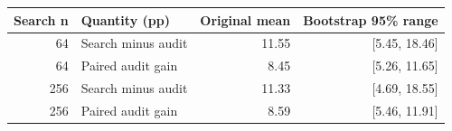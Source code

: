 \begin{tabular}{rlrr}
\toprule
Search n & Quantity (pp) & Original mean & Bootstrap 95\% range \\
\midrule
64 & Search minus audit & 11.55 & [5.45, 18.46] \\
64 & Paired audit gain & 8.45 & [5.26, 11.65] \\
256 & Search minus audit & 11.33 & [4.69, 18.55] \\
256 & Paired audit gain & 8.59 & [5.46, 11.91] \\
\bottomrule
\end{tabular}
